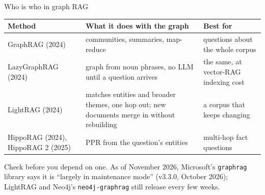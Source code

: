 \documentclass[aspectratio=169]{beamer}
\newcommand{\watchbox}[1]{%
  \begin{tcolorbox}[colback=armorange!12, colframe=armorange, boxrule=0.6pt, arc=2pt]
  #1
  \end{tcolorbox}}
\begin{document}
\begin{frame}{Who is who in graph RAG}
  \vspace{0.2em}
  \begin{center}
  \small
  \begin{tabular}{>{\raggedright\arraybackslash}p{}>{\raggedright\arraybackslash}p{}>{\raggedright\arraybackslash}p{}}
    \toprule
    \textbf{Method} & \textbf{What it does with the graph} & \textbf{Best for} \\
    \midrule
    GraphRAG (2024) & communities, summaries, map-reduce & questions about the whole corpus \\
    LazyGraphRAG (2024) & graph from noun phrases, no LLM until a question arrives & the same, at
      vector-RAG indexing cost \\
    LightRAG (2024) & matches entities and broader themes, one hop out; new documents merge in
      without rebuilding & a corpus that keeps changing \\
    HippoRAG (2024), HippoRAG 2 (2025) & PPR from the question's entities & multi-hop fact questions \\
    \bottomrule
  \end{tabular}
  \end{center}

  \vspace{0.3em}
  \watchbox{\small Check before you depend on one. As of November 2026, Microsoft's \texttt{graphrag}
  library says it is ``largely in maintenance mode'' (v3.3.0, October 2026); LightRAG and
  Neo4j's \texttt{neo4j-graphrag} still release every few weeks.}
\end{frame}
\end{document}
